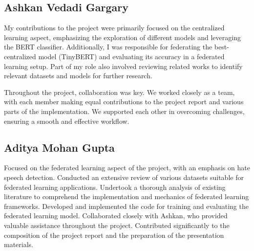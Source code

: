 \documentclass[11pt]{article}
\begin{document}
\subsection{Ashkan Vedadi Gargary}
My contributions to the project were primarily focused on the centralized learning aspect, emphasizing the exploration of different models and leveraging the BERT classifier. Additionally, I was responsible for federating the best-centralized model (TinyBERT) and evaluating its accuracy in a federated learning setup. Part of my role also involved reviewing related works to identify relevant datasets and models for further research.

Throughout the project, collaboration was key. We worked closely as a team, with each member making equal contributions to the project report and various parts of the implementation. We supported each other in overcoming challenges, ensuring a smooth and effective workflow.

\subsection{Aditya Mohan Gupta}

Focused on the federated learning aspect of the project, with an emphasis on hate speech detection. Conducted an extensive review of various datasets suitable for federated learning applications. Undertook a thorough analysis of existing literature to comprehend the implementation and mechanics of federated learning frameworks. Developed and implemented the code for training and evaluating the federated learning model. Collaborated closely with Ashkan, who provided valuable assistance throughout the project. Contributed significantly to the composition of the project report and the preparation of the presentation materials.
\end{document}
